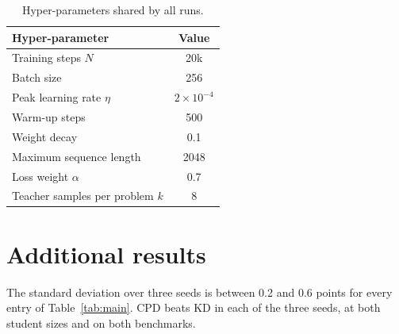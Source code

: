 \documentclass{article} %
\begin{document}
\begin{table}[h]
\caption{Hyper-parameters shared by all runs.}
\label{tab:hparams}
\centering
\begin{tabular}{lc}
\toprule
Hyper-parameter & Value \\
\midrule
Training steps $N$ & 20k \\
Batch size & 256 \\
Peak learning rate $\eta$ & $2 \times 10^{-4}$ \\
Warm-up steps & 500 \\
Weight decay & 0.1 \\
Maximum sequence length & 2048 \\
Loss weight $\alpha$ & 0.7 \\
Teacher samples per problem $k$ & 8 \\
\bottomrule
\end{tabular}
\end{table}

\section{Additional results}
\label{app:results}

The standard deviation over three seeds is between 0.2 and 0.6 points for every entry of Table~\ref{tab:main}.
CPD beats KD in each of the three seeds, at both student sizes and on both benchmarks.
\end{document}
